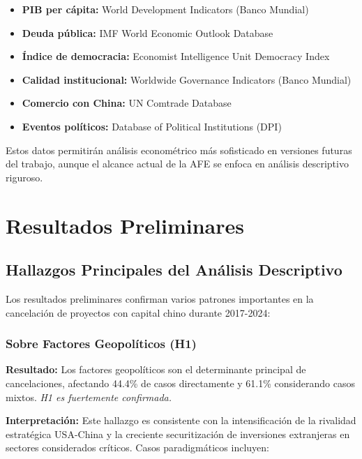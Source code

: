 \documentclass[12pt]{article}
\begin{document}
\begin{itemize}
    \item \textbf{PIB per cápita:} World Development Indicators (Banco Mundial)
    \item \textbf{Deuda pública:} IMF World Economic Outlook Database
    \item \textbf{Índice de democracia:} Economist Intelligence Unit Democracy Index
    \item \textbf{Calidad institucional:} Worldwide Governance Indicators (Banco Mundial)
    \item \textbf{Comercio con China:} UN Comtrade Database
    \item \textbf{Eventos políticos:} Database of Political Institutions (DPI)
\end{itemize}

Estos datos permitirán análisis econométrico más sofisticado en versiones futuras del trabajo, aunque el alcance actual de la AFE se enfoca en análisis descriptivo riguroso.

\section{Resultados Preliminares}

\subsection{Hallazgos Principales del Análisis Descriptivo}

Los resultados preliminares confirman varios patrones importantes en la cancelación de proyectos con capital chino durante 2017-2024:

\subsubsection{Sobre Factores Geopolíticos (H1)}

\textbf{Resultado:} Los factores geopolíticos son el determinante principal de cancelaciones, afectando 44.4\% de casos directamente y 61.1\% considerando casos mixtos. \textit{H1 es fuertemente confirmada.}

\textbf{Interpretación:} Este hallazgo es consistente con la intensificación de la rivalidad estratégica USA-China y la creciente securitización de inversiones extranjeras en sectores considerados críticos. Casos paradigmáticos incluyen:
\end{document}
